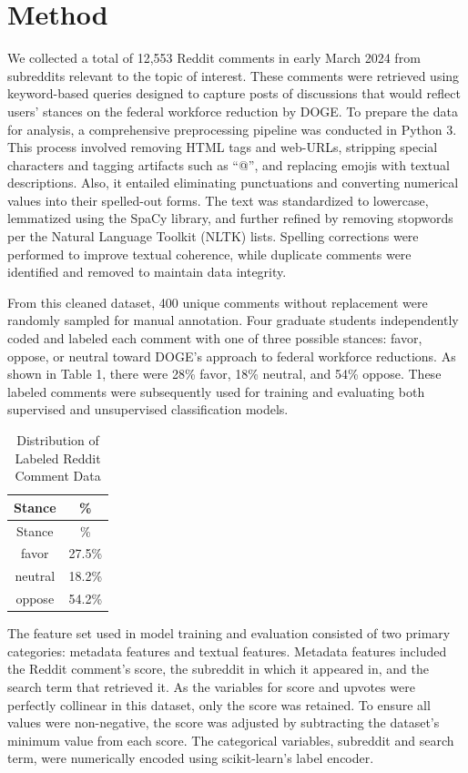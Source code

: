 \documentclass[
  12pt]{article}
\begin{document}
\section{Method}\label{sec-meth}

We collected a total of 12,553 Reddit comments in early March 2024 from
subreddits relevant to the topic of interest. These comments were
retrieved using keyword-based queries designed to capture posts of
discussions that would reflect users' stances on the federal workforce
reduction by DOGE. To prepare the data for analysis, a comprehensive
preprocessing pipeline was conducted in Python 3. This process involved
removing HTML tags and web-URLs, stripping special characters and
tagging artifacts such as ``@'', and replacing emojis with textual
descriptions. Also, it entailed eliminating punctuations and converting
numerical values into their spelled-out forms. The text was standardized
to lowercase, lemmatized using the SpaCy library, and further refined by
removing stopwords per the Natural Language Toolkit (NLTK) lists.
Spelling corrections were performed to improve textual coherence, while
duplicate comments were identified and removed to maintain data
integrity.

From this cleaned dataset, 400 unique comments without replacement were
randomly sampled for manual annotation. Four graduate students
independently coded and labeled each comment with one of three possible
stances: favor, oppose, or neutral toward DOGE's approach to federal
workforce reductions. As shown in Table 1, there were 28\% favor, 18\%
neutral, and 54\% oppose. These labeled comments were subsequently used
for training and evaluating both supervised and unsupervised
classification models.

\begin{longtable}[]{@{}cc@{}}
\caption{Distribution of Labeled Reddit Comment Data}\tabularnewline
\toprule\noalign{}
Stance & \% \\
\midrule\noalign{}
\endfirsthead
\toprule\noalign{}
Stance & \% \\
\midrule\noalign{}
\endhead
\bottomrule\noalign{}
\endlastfoot
favor & 27.5\% \\
neutral & 18.2\% \\
oppose & 54.2\% \\
\end{longtable}

The feature set used in model training and evaluation consisted of two
primary categories: metadata features and textual features. Metadata
features included the Reddit comment's score, the subreddit in which it
appeared in, and the search term that retrieved it. As the variables for
score and upvotes were perfectly collinear in this dataset, only the
score was retained. To ensure all values were non-negative, the score
was adjusted by subtracting the dataset's minimum value from each score.
The categorical variables, subreddit and search term, were numerically
encoded using scikit-learn's label encoder.
\end{document}
